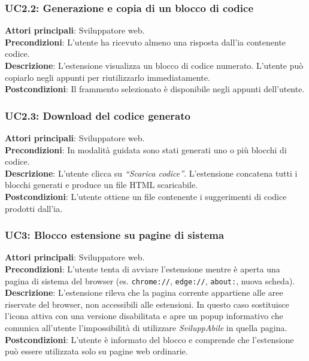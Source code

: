 \subsubsection*{UC2.2: Generazione e copia di un blocco di codice}
\noindent \textbf{Attori principali}: Sviluppatore web.\\
\textbf{Precondizioni}: L’utente ha ricevuto almeno una risposta dall’\acrshort{ia} contenente codice.\\
\textbf{Descrizione}: L’estensione visualizza un blocco di codice numerato. L’utente può copiarlo negli appunti per riutilizzarlo immediatamente.\\
\textbf{Postcondizioni}: Il frammento selezionato è disponibile negli appunti dell’utente.\\

\subsubsection*{UC2.3: Download del codice generato}
\noindent \textbf{Attori principali}: Sviluppatore web.\\
\textbf{Precondizioni}: In modalità guidata sono stati generati uno o più blocchi di codice.\\
\textbf{Descrizione}: L’utente clicca su \textit{“Scarica codice”}. L’estensione concatena tutti i blocchi generati e produce un file HTML scaricabile.\\
\textbf{Postcondizioni}: L’utente ottiene un file contenente i suggerimenti di codice prodotti dall’\acrshort{ia}.\\


\subsubsection*{UC3: Blocco estensione su pagine di sistema}
\noindent \textbf{Attori principali}: Sviluppatore web.\\
\textbf{Precondizioni}: L’utente tenta di avviare l’estensione mentre è aperta una pagina di sistema del browser (es. \texttt{chrome://}, \texttt{edge://}, \texttt{about:}, nuova scheda).\\
\textbf{Descrizione}: L’estensione rileva che la pagina corrente appartiene alle aree riservate del browser, non accessibili alle estensioni. In questo caso sostituisce l’icona attiva con una versione disabilitata e apre un popup informativo che comunica all’utente l’impossibilità di utilizzare \textit{SviluppAbile} in quella pagina.\\
\textbf{Postcondizioni}: L’utente è informato del blocco e comprende che l’estensione può essere utilizzata solo su pagine web ordinarie.\\

